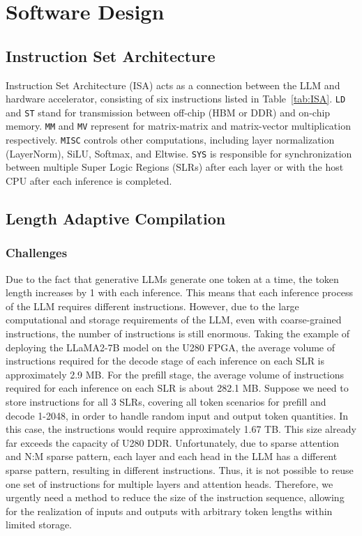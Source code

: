 \section{Software Design}

\subsection{Instruction Set Architecture}\label{sec:ISA}

Instruction Set Architecture (ISA) acts as a connection between the LLM and hardware accelerator, consisting of six instructions listed in Table~\ref{tab:ISA}. \texttt{LD} and \texttt{ST} stand for transmission between off-chip (HBM or DDR) and on-chip memory. \texttt{MM} and \texttt{MV} represent for matrix-matrix and matrix-vector multiplication respectively. \texttt{MISC} controls other computations, including layer normalization (LayerNorm), SiLU, Softmax, and Eltwise. \texttt{SYS} is responsible for synchronization between multiple Super Logic Regions (SLRs) after each layer or with the host CPU after each inference is completed. 



\vspace{-5pt}
\subsection{Length Adaptive Compilation}

\subsubsection{Challenges}
Due to the fact that generative LLMs generate one token at a time, the token length increases by 1 with each inference. This means that each inference process of the LLM requires different instructions. However, due to the large computational and storage requirements of the LLM, even with coarse-grained instructions, the number of instructions is still enormous. Taking the example of deploying the LLaMA2-7B model on the U280 FPGA, the average volume of instructions required for the decode stage of each inference on each SLR is approximately 2.9 MB. For the prefill stage, the average volume of instructions required for each inference on each SLR is about 282.1 MB. Suppose we need to store instructions for all 3 SLRs, covering all token scenarios for prefill and decode 1-2048, in order to handle random input and output token quantities. In this case, the instructions would require approximately 1.67 TB. This size already far exceeds the capacity of U280 DDR. Unfortunately, due to sparse attention and N:M sparse pattern, each layer and each head in the LLM has a different sparse pattern, resulting in different instructions. Thus, it is not possible to reuse one set of instructions for multiple layers and attention heads. Therefore, we urgently need a method to reduce the size of the instruction sequence, allowing for the realization of inputs and outputs with arbitrary token lengths within limited storage.




